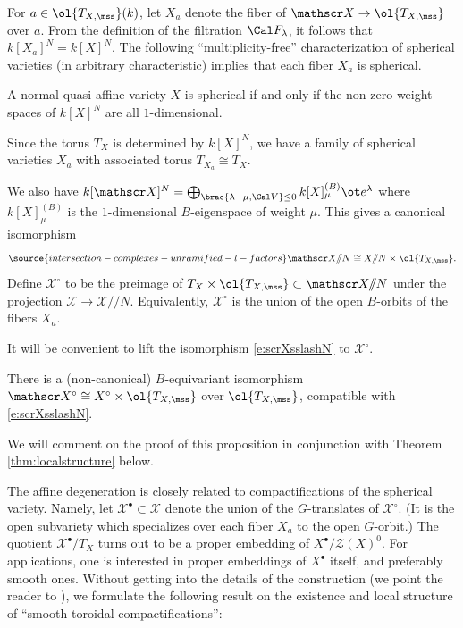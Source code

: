 \subsubsection{}
For $a \in \ol{T_{X,\mss}}(k)$, let $X_a$ denote the fiber of
$\mathscr X \to \ol{T_{X,\mss}}$ over $a$.
From the definition of the filtration $\Cal F_\lambda$, it follows that
$k[X_a]^N = k[X]^N$.
The following ``multiplicity-free'' characterization of spherical varieties (in arbitrary
characteristic) implies that each fiber $X_a$ is spherical.

\begin{thm}
\notready
A normal quasi-affine variety $X$ is spherical if and only if
the non-zero weight spaces of $k[X]^N$ are all $1$-dimensional.
\end{thm}

Since the torus $T_X$ is determined by $k[X]^N$, we have a family of spherical varieties
$X_a$ with associated torus $T_{X_a} \cong T_X$.

We also have $k[\mathscr X]^N = \bigoplus_{\brac{\lambda-\mu,\Cal V}\le 0} k[X]^{(B)}_\mu \ot e^\lambda$ where $k[X]^{(B)}_\mu$ is the $1$-dimensional $B$-eigenspace of weight $\mu$.
This gives a canonical isomorphism
\begin{equation} \label{e:scrXsslashN}
\source{intersection-complexes-unramified-l-factors}
    \mathscr X/\!\!/N \cong X/\!\!/N \times \ol{T_{X,\mss}}.
\end{equation}
Define $\mathscr X^\circ$ to be the preimage of
$T_X \times \ol{T_{X,\mss}} \subset \mathscr X/\!\!/N$ under the projection
$\mathscr X \to \mathscr X/\!\!/N$.
Equivalently, $\mathscr X^\circ$ is the union of the open $B$-orbits of the fibers $X_a$.



It will be convenient to lift the isomorphism \eqref{e:scrXsslashN} to $\mathscr X^\circ$.
\begin{prop}
\notready \label{prop:noncanon-section}
There is a (non-canonical) $B$-equivariant isomorphism $\mathscr X^\circ \cong X^\circ \times \ol{T_{X,\mss}}$ over $\ol{T_{X,\mss}}$, compatible with \eqref{e:scrXsslashN}.
\end{prop}

We will comment on the proof of this proposition in conjunction with Theorem \ref{thm:localstructure} below.

The affine degeneration is closely related to compactifications of the spherical variety.
Namely, let $\mathscr X^\bullet \subset \mathscr X$ denote the union of the $G$-translates of $\mathscr X^\circ$. (It is the open subvariety which
specializes over each fiber $X_a$ to the open $G$-orbit.)
The quotient $\mathscr X^\bullet/ T_X$ turns out to be a proper embedding of $X^\bullet/\mathcal Z(X)^0$. For applications, one is interested in proper embeddings of $X^\bullet$ itself, and preferably smooth ones. Without getting into the details of the construction (we point the reader to \cite{KnLV}), we formulate the following result on the existence and local structure of ``smooth toroidal compactifications'':

